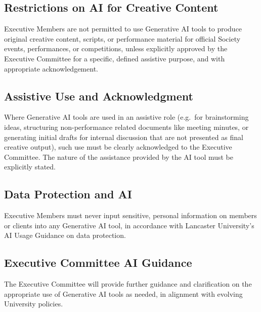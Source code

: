 \documentclass[11pt,a4paper]{article}
\begin{document}
\subsection{Restrictions on AI for Creative Content}
Executive Members are not permitted to use Generative AI tools to produce original creative content, scripts, or performance material for official Society events, performances, or competitions, unless explicitly approved by the Executive Committee for a specific, defined assistive purpose, and with appropriate acknowledgement.

\subsection{Assistive Use and Acknowledgment}
Where Generative AI tools are used in an assistive role (e.g.\ for brainstorming ideas, structuring non-performance related documents like meeting minutes, or generating initial drafts for internal discussion that are not presented as final creative output), such use must be clearly acknowledged to the Executive Committee. The nature of the assistance provided by the AI tool must be explicitly stated.

\subsection{Data Protection and AI}
Executive Members must never input sensitive, personal information on members or clients into any Generative AI tool, in accordance with Lancaster University’s AI Usage Guidance on data protection.

\subsection{Executive Committee AI Guidance}
The Executive Committee will provide further guidance and clarification on the appropriate use of Generative AI tools as needed, in alignment with evolving University policies.
\end{document}
